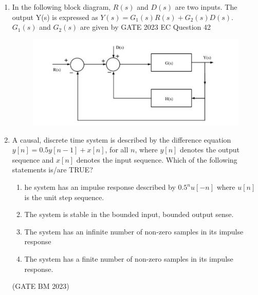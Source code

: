 \begin{enumerate}[label=\thechapter.\arabic*,ref=\thechapter.\theenumi]
\item  In the following block diagram, $R(s)$ and $D(s)$ are two inputs. The output Y(s) is expressed as $Y(s) = G_1(s)R(s) + G_2(s)D(s).$\\
$G_1(s)$ and $G_2(s)$ are given by \hfill{GATE 2023 EC Question 42}\\
\begin{figure}[htbp]
\centering
\includegraphics[width=\columnwidth]{2023/EC/42/figs/gate.png}
\end{figure}
\solution
\newpage


\item A causal, discrete time system is described by the difference equation $y[n] = 0.5 y[n-1] + x[n]$, for all $n$, where $y[n]$ denotes the output sequence and $x[n]$ denotes the input sequence. Which of the following statements is/are TRUE?
\begin{flushright}
\end{flushright}

\begin{enumerate}[label = (\alph*)]
	\item he system has an impulse response described by $0.5^{n} u[-n]$ where $u[n]$ is the  
unit step sequence. 		
	\item The system is stable in the bounded input, bounded output sense.
	\item The system has an infinite number of non-zero samples in its impulse response
	\item The system has a finite number of non-zero samples in its impulse response.
\end{enumerate}
\hfill(GATE BM 2023) \\
\solution
\newpage

\end{enumerate}
